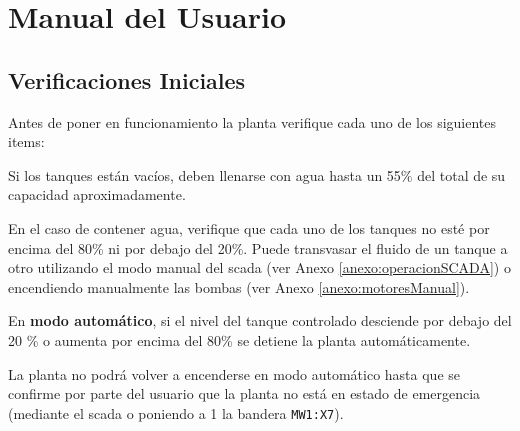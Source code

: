 \chapter{Manual del Usuario}
\label{anexo:manualUsuario}

\section{Verificaciones Iniciales}
\label{anexo:verificaciones}
Antes de poner en funcionamiento la planta verifique cada uno de los siguientes
items:

\begin{tcolorbox}[title=Nivel de agua]
Si los tanques están vacíos, deben llenarse con agua hasta un 55\%
del total de su capacidad aproximadamente.

En el caso de contener agua, verifique que cada uno de los tanques no esté por
encima del 80\% ni por debajo del 20\%.
Puede transvasar el fluido de un tanque a otro utilizando el modo manual del
\gls{scada} (ver Anexo \ref{anexo:operacionSCADA}) o encendiendo manualmente
las bombas (ver Anexo \ref{anexo:motoresManual}).
\end {tcolorbox}
\begin{lattention}
En \textbf{modo automático}, si el nivel del tanque controlado desciende por
debajo del
20 \% o aumenta por encima del 80\% se detiene la planta automáticamente.

La planta no podrá volver a encenderse en modo automático hasta que se confirme
por parte del usuario que la planta no está en estado de emergencia (mediante el
\gls{scada} o poniendo a 1 la bandera \verb|MW1:X7|).
\end{lattention}


